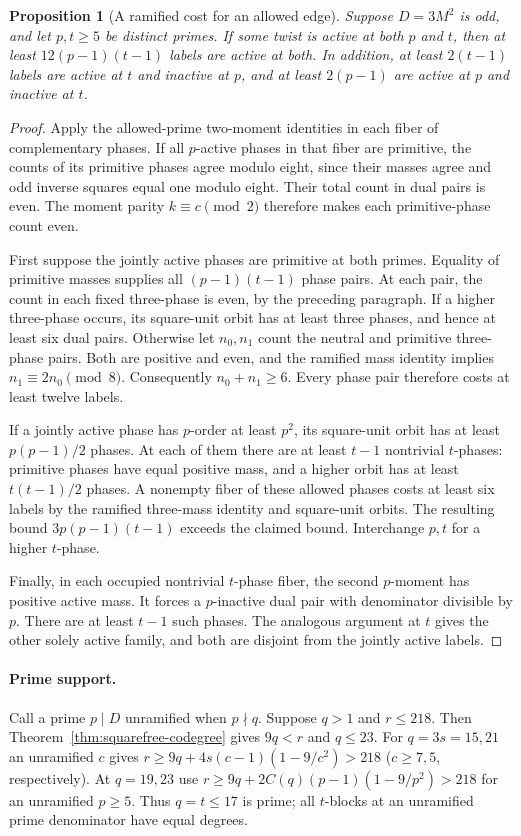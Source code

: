\documentclass[11pt]{amsart}
\numberwithin{equation}{section}
\newtheorem{proposition}[theorem]{Proposition}
\theoremstyle{definition}
\theoremstyle{plain}
\begin{document}
\begin{proposition}[A ramified cost for an allowed edge]\label{r8:ramified-edge}
Suppose $D=3M^2$ is odd, and let $p,t\ge5$ be distinct primes.
If some twist is active at both $p$ and $t$, then at least
$12(p-1)(t-1)$ labels are active at both. In addition, at least
$2(t-1)$ labels are active at $t$ and inactive at $p$, and at least
$2(p-1)$ are active at $p$ and inactive at $t$.
\end{proposition}
\begin{proof}
Apply the allowed-prime two-moment identities in each fiber of
complementary phases. If all $p$-active phases in that fiber are
primitive, the counts of its primitive phases agree modulo eight,
since their masses agree and odd inverse squares equal one modulo
eight. Their total count in dual pairs is even. The moment parity
$k\equiv c\pmod2$ therefore makes each primitive-phase count even.

First suppose the jointly active phases are primitive at both primes.
Equality of primitive masses supplies all $(p-1)(t-1)$ phase pairs.
At each pair, the count in each fixed three-phase is even, by the
preceding paragraph. If a higher three-phase occurs, its square-unit
orbit has at least three phases, and hence at least six dual pairs.
Otherwise let $n_0,n_1$ count the neutral and primitive three-phase
pairs. Both are positive and even, and the ramified mass identity
implies $n_1\equiv2n_0\pmod8$. Consequently $n_0+n_1\ge6$.
Every phase pair therefore costs at least twelve labels.

If a jointly active phase has $p$-order at least $p^2$, its
square-unit orbit has at least $p(p-1)/2$ phases. At each of them
there are at least $t-1$ nontrivial $t$-phases: primitive phases have
equal positive mass, and a higher orbit has at least $t(t-1)/2$
phases. A nonempty fiber of these allowed phases costs at least
six labels by the ramified three-mass identity and square-unit
orbits. The resulting bound $3p(p-1)(t-1)$ exceeds the claimed
bound. Interchange $p,t$ for a higher $t$-phase.

Finally, in each occupied nontrivial $t$-phase fiber, the second
$p$-moment has positive active mass. It forces a $p$-inactive dual
pair with denominator divisible by $p$. There are at least $t-1$
such phases. The analogous argument at $t$ gives the other solely
active family, and both are disjoint from the jointly active labels.
\end{proof}

\paragraph{Prime support.}
Call a prime $p\mid D$ unramified when $p\nmid q$. Suppose $q>1$ and $r\le218$. Then
Theorem~\ref{thm:squarefree-codegree} gives $9q<r$ and $q\le23$. For $q=3s=15,21$ an
unramified $c$ gives $r\ge9q+4s(c-1)(1-9/c^2)>218$
($c\ge7,5$, respectively). At $q=19,23$ use
$r\ge9q+2C(q)(p-1)(1-9/p^2)>218$ for an unramified $p\ge5$.
Thus $q=t\le17$ is prime; all $t$-blocks at an unramified prime
denominator have equal degrees.
\end{document}
